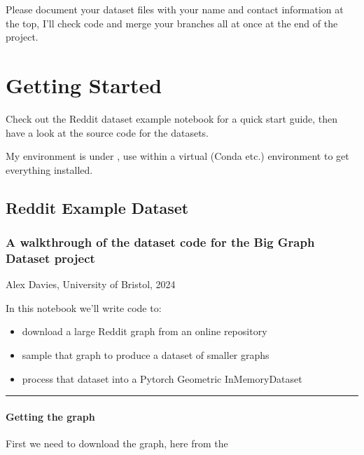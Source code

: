 \documentclass[letterpaper,10pt,english]{sphinxhowto}
\begin{document}
\sphinxAtStartPar
Please document your dataset files with your name and contact information at the top, I’ll check code and merge your branches all at once at the end of the project.


\section{Getting Started}
\label{\detokenize{index:getting-started}}
\sphinxAtStartPar
Check out the Reddit dataset example notebook for a quick start guide, then have a look at the source code for the datasets.

\sphinxAtStartPar
My environment is under , use  within a virtual (Conda etc.) environment to get everything installed.

\sphinxstepscope


\subsection{Reddit Example Dataset}
\label{\detokenize{reddit-dataset-example:Reddit-Example-Dataset}}\label{\detokenize{reddit-dataset-example::doc}}

\subsubsection{A walkthrough of the dataset code for the Big Graph Dataset project}
\label{\detokenize{reddit-dataset-example:A-walkthrough-of-the-dataset-code-for-the-Big-Graph-Dataset-project}}
\sphinxAtStartPar
Alex Davies, University of Bristol, 2024

\sphinxAtStartPar
In this notebook we’ll write code to:
\begin{itemize}
\item {} 
\sphinxAtStartPar
download a large Reddit graph from an online repository

\item {} 
\sphinxAtStartPar
sample that graph to produce a dataset of smaller graphs

\item {} 
\sphinxAtStartPar
process that dataset into a Pytorch Geometric InMemoryDataset

\end{itemize}


\bigskip\hrule\bigskip



\paragraph{Getting the graph}
\label{\detokenize{reddit-dataset-example:Getting-the-graph}}
\sphinxAtStartPar
First we need to download the graph, here from the 
\end{document}
